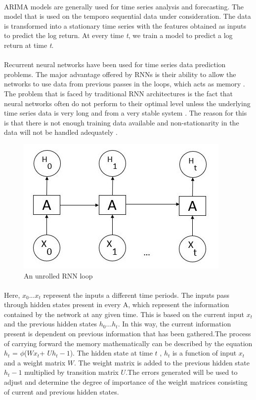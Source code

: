 \documentclass[12pt]{article}%
\begin{document}
\paragraph{}ARIMA models are generally used for time series analysis and forecasting. The model that is used on the temporo sequential data under consideration. The data is transformed into a stationary time series with the features obtained as inputs to predict the log return. At every time \textit{t}, we train a model to predict a log return at time \textit{t}.

\paragraph{}
Recurrent neural networks have been used for time series data prediction problems. The major advantage offered by RNNs is their ability to allow the networks to use data from previous passes in the loops, which acts as memory \cite{31}. The problem that is faced by traditional RNN architectures is the fact that neural networks often do not perform to their optimal level unless the underlying time series data is very long and from a very stable system \cite{32}. The reason for this is that there is not enough training data available and non-stationarity in the data will not be handled adequately \cite{33}.

\begin{figure}[h]
\centering
\includegraphics[width=0.8\columnwidth]{unrolled_lstm}
\caption{An unrolled RNN loop}
\end{figure}

\paragraph{}Here, $x_0 ... x_t$ represent the inputs a different time periods. The inputs pass through hidden states present in every A, which represent the information contained by the network at any given time. This is based on the current input $x_t$ and the previous hidden states $h_0…h_t$. In this way, the current information present is dependent on previous information that has been gathered.The process of carrying forward the memory mathematically can be described by the equation $h_t$ = $\phi$($Wx_t$+ $Uh_t-1$). The hidden state at time $t$ , $h_t$ is a function of input $x_t$ and a weight matrix $W$. The weight matrix is added to the previous hidden state $h_t-1$ multiplied by transition matrix $U$.The errors generated will be used to adjust and determine the degree of importance of the weight matrices consisting of current and previous hidden states.
\end{document}
